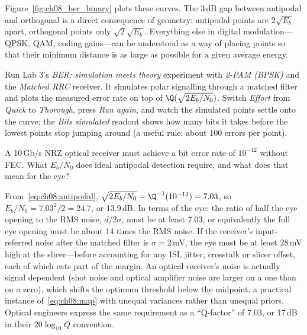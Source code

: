 Figure~\ref{fig:ch08_ber_binary} plots these curves. The 3\,dB gap between antipodal and
orthogonal is a direct consequence of geometry: antipodal points are $2\sqrt{E_b}$ apart,
orthogonal points only $\sqrt2\sqrt{E_b}$. Everything else in digital modulation---QPSK, QAM,
coding gains---can be understood as a way of placing points so that their minimum distance is
as large as possible for a given average energy.

\begin{tryit}
Run Lab 3's \emph{BER: simulation meets theory} experiment with \emph{2-PAM (BPSK)} and the
\emph{Matched RRC} receiver. It simulates polar signalling through a matched filter and plots the
measured error rate on top of $\Q(\sqrt{2E_b/N_0})$. Switch \emph{Effort} from \emph{Quick} to
\emph{Thorough}, press \emph{Run again}, and watch the simulated points settle onto the curve; the
\emph{Bits simulated} readout shows how many bits it takes before the lowest points stop jumping
around (a useful rule: about 100 errors per point).
\end{tryit}

\begin{worked}
A 10\,Gb/s NRZ optical receiver must achieve a bit error rate of $10^{-12}$ without FEC. What
$E_b/N_0$ does ideal antipodal detection require, and what does that mean for the eye?

From~\eqref{eq:ch08:antipodal}, $\sqrt{2E_b/N_0}=\Q^{-1}(10^{-12})=7.03$, so
$E_b/N_0=7.03^2/2=24.7$, or 13.9\,dB. In terms of the eye: the ratio of half the eye opening to
the RMS noise, $d/2\sigma$, must be at least 7.03, or equivalently the full eye opening must be
about 14 times the RMS noise. If the receiver's input-referred noise after the matched filter is
$\sigma=2$\,mV, the eye must be at least 28\,mV high at the slicer---before accounting for any
ISI, jitter, crosstalk or slicer offset, each of which eats part of the margin. An optical
receiver's noise is actually signal dependent (shot noise and optical amplifier noise are larger
on a one than on a zero), which shifts the optimum threshold below the midpoint, a
practical instance of~\eqref{eq:ch08:map} with unequal variances rather than unequal priors.
Optical engineers express the same requirement as a ``Q-factor'' of 7.03, or 17\,dB in their
$20\log_{10}Q$ convention.
\end{worked}

